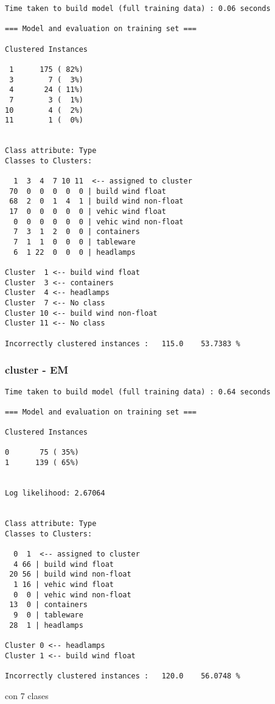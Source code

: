 \documentclass[a4paper]{article}
\begin{document}
\begin{verbatim}
Time taken to build model (full training data) : 0.06 seconds

=== Model and evaluation on training set ===

Clustered Instances

 1      175 ( 82%)
 3        7 (  3%)
 4       24 ( 11%)
 7        3 (  1%)
10        4 (  2%)
11        1 (  0%)


Class attribute: Type
Classes to Clusters:

  1  3  4  7 10 11  <-- assigned to cluster
 70  0  0  0  0  0 | build wind float
 68  2  0  1  4  1 | build wind non-float
 17  0  0  0  0  0 | vehic wind float
  0  0  0  0  0  0 | vehic wind non-float
  7  3  1  2  0  0 | containers
  7  1  1  0  0  0 | tableware
  6  1 22  0  0  0 | headlamps

Cluster  1 <-- build wind float
Cluster  3 <-- containers
Cluster  4 <-- headlamps
Cluster  7 <-- No class
Cluster 10 <-- build wind non-float
Cluster 11 <-- No class

Incorrectly clustered instances :	115.0	 53.7383 %
\end{verbatim}

\subsubsection{cluster - EM}

\begin{verbatim}
Time taken to build model (full training data) : 0.64 seconds

=== Model and evaluation on training set ===

Clustered Instances

0       75 ( 35%)
1      139 ( 65%)


Log likelihood: 2.67064


Class attribute: Type
Classes to Clusters:

  0  1  <-- assigned to cluster
  4 66 | build wind float
 20 56 | build wind non-float
  1 16 | vehic wind float
  0  0 | vehic wind non-float
 13  0 | containers
  9  0 | tableware
 28  1 | headlamps

Cluster 0 <-- headlamps
Cluster 1 <-- build wind float

Incorrectly clustered instances :	120.0	 56.0748 %

\end{verbatim}

con 7 clases
\end{document}
